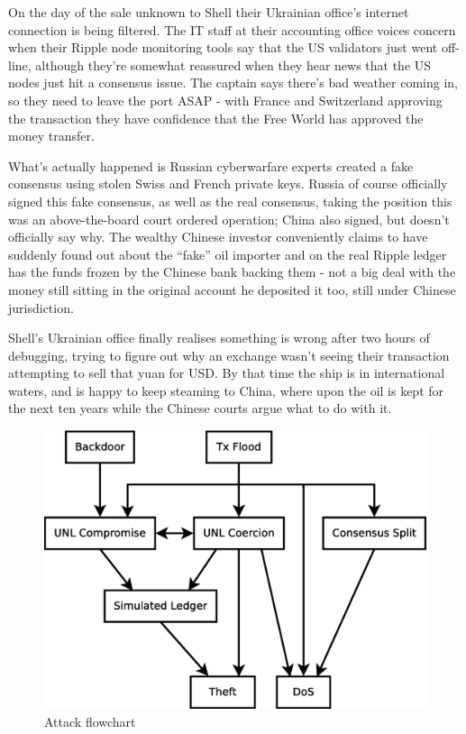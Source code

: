 \documentclass{article}
\begin{document}
On the day of the sale unknown to Shell their Ukrainian office's internet
connection is being filtered. The IT staff at their accounting office voices
concern when their Ripple node monitoring tools say that the US validators just
went off-line, although they're somewhat reassured when they hear news that the
US nodes just hit a consensus issue. The captain says there's bad weather
coming in, so they need to leave the port ASAP - with France and Switzerland
approving the transaction they have confidence that the Free World has approved
the money transfer.

What's actually happened is Russian cyberwarfare experts created a fake
consensus using stolen Swiss and French private keys. Russia of course
officially signed this fake consensus, as well as the real consensus, taking
the position this was an above-the-board court ordered operation; China also
signed, but doesn't officially say why. The wealthy Chinese investor
conveniently claims to have suddenly found out about the ``fake'' oil importer
and on the real Ripple ledger has the funds frozen by the Chinese bank backing
them - not a big deal with the money still sitting in the original account he
deposited it too, still under Chinese jurisdiction.

Shell's Ukrainian office finally realises something is wrong after two hours of
debugging, trying to figure out why an exchange wasn't seeing their transaction
attempting to sell that yuan for USD. By that time the ship is in international
waters, and is happy to keep steaming to China, where upon the oil is kept for
the next ten years while the Chinese courts argue what to do with it.

\begin{figure}
    \centering
    \includegraphics[scale=0.5]{figures/attack-flowchart.eps}
    \caption{Attack flowchart}
    \label{fig:attack-flowchart}
\end{figure}




\end{document}
